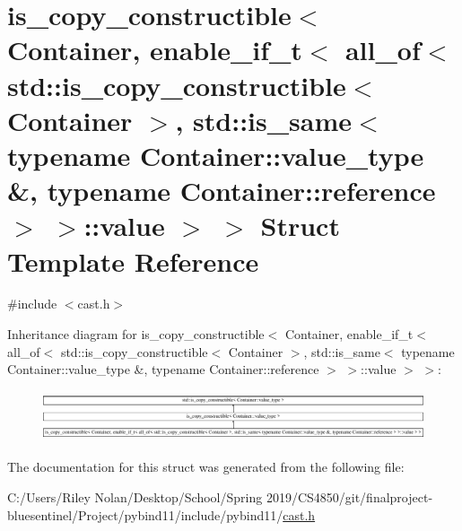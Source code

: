 \hypertarget{structis__copy__constructible_3_01_container_00_01enable__if__t_3_01all__of_3_01std_1_1is__copy_5054bfad8264ee48f378cc055f0791b3}{}\section{is\+\_\+copy\+\_\+constructible$<$ Container, enable\+\_\+if\+\_\+t$<$ all\+\_\+of$<$ std\+::is\+\_\+copy\+\_\+constructible$<$ Container $>$, std\+::is\+\_\+same$<$ typename Container\+::value\+\_\+type \&, typename Container\+::reference $>$ $>$\+::value $>$ $>$ Struct Template Reference}
\label{structis__copy__constructible_3_01_container_00_01enable__if__t_3_01all__of_3_01std_1_1is__copy_5054bfad8264ee48f378cc055f0791b3}


{\ttfamily \#include $<$cast.\+h$>$}

Inheritance diagram for is\+\_\+copy\+\_\+constructible$<$ Container, enable\+\_\+if\+\_\+t$<$ all\+\_\+of$<$ std\+::is\+\_\+copy\+\_\+constructible$<$ Container $>$, std\+::is\+\_\+same$<$ typename Container\+::value\+\_\+type \&, typename Container\+::reference $>$ $>$\+::value $>$ $>$\+:\begin{figure}[H]
\begin{center}
\leavevmode
\includegraphics[height=1.508079cm]{structis__copy__constructible_3_01_container_00_01enable__if__t_3_01all__of_3_01std_1_1is__copy_5054bfad8264ee48f378cc055f0791b3}
\end{center}
\end{figure}


The documentation for this struct was generated from the following file\+:\begin{DoxyCompactItemize}
\item 
C\+:/\+Users/\+Riley Nolan/\+Desktop/\+School/\+Spring 2019/\+C\+S4850/git/finalproject-\/bluesentinel/\+Project/pybind11/include/pybind11/\mbox{\hyperlink{cast_8h}{cast.\+h}}\end{DoxyCompactItemize}
